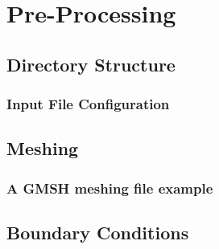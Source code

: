 \documentclass[../Dissertation]{subfiles}
\begin{document}
\section{Pre-Processing}		\label{sec:chp4_Preprocessing}
    \lipsum[1-5]

    \subsection{Directory Structure}			\label{sec:DirectoryStruc}
      \lipsum[1]
      \subsubsection{Input File Configuration}		\label{subsubsec:InputFile}

    \subsection{Meshing}				\label{subsec:Meshing}
      \lipsum[1]
      \subsubsection{A GMSH meshing file example}	\label{subsubsec:meshFile}
    \subsection{Boundary Conditions}			\label{subsec:BoundaryCond}
      \lipsum[1]
\end{document}
